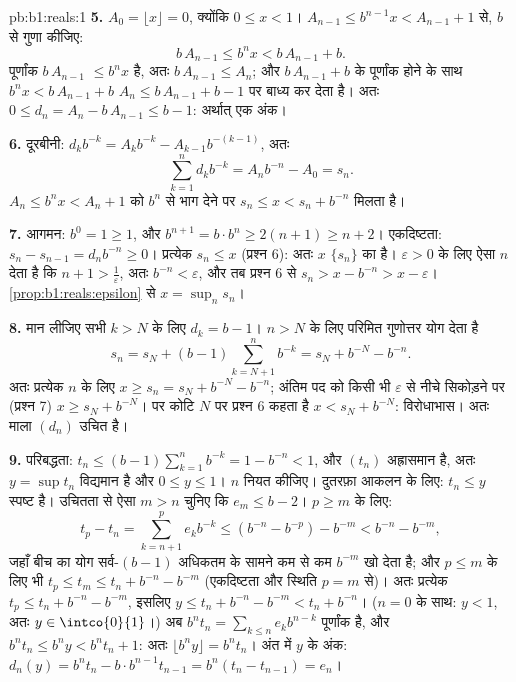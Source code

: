 \begin{solution}{pb:b1:reals:1}
\textbf{5.} $A_0 = \lfloor x \rfloor = 0$, क्योंकि $0 \leq x < 1$। $A_{n-1}
\leq b^{n-1} x < A_{n-1} + 1$ से, $b$ से गुणा कीजिए:
\[
b\,A_{n-1} \leq b^n x < b\,A_{n-1} + b .
\]
पूर्णांक $b\,A_{n-1}$ $\leq b^n x$ है, अतः $b\,A_{n-1} \leq A_n$; और
$b\,A_{n-1} + b$ के पूर्णांक होने के साथ $b^n x < b\,A_{n-1} + b$ $A_n \leq
b\,A_{n-1} + b - 1$ पर बाध्य कर देता है। अतः $0 \leq d_n = A_n - b\,A_{n-1}
\leq b - 1$: अर्थात् एक अंक।

\textbf{6.} दूरबीनी: $d_k b^{-k} = A_k b^{-k} - A_{k-1} b^{-(k-1)}$, अतः
\[
\sum_{k=1}^n d_k b^{-k} = A_n b^{-n} - A_0 = s_n .
\]
$A_n \leq b^n x < A_n + 1$ को $b^n$ से भाग देने पर $s_n \leq x < s_n +
b^{-n}$ मिलता है।

\textbf{7.} आगमन: $b^0 = 1 \geq 1$, और $b^{n+1} = b \cdot b^n \geq 2(n + 1)
\geq n + 2$। एकदिष्टता: $s_n - s_{n-1} = d_n b^{-n} \geq 0$। प्रत्येक $s_n
\leq x$ (प्रश्न 6): अतः $x$ $\{s_n\}$ का  है। $\varepsilon > 0$
के लिए  ऐसा $n$ देता है कि $n + 1 > \frac1\varepsilon$,
अतः $b^{-n} < \varepsilon$, और तब प्रश्न 6 से $s_n > x - b^{-n} > x -
\varepsilon$। \cref{prop:b1:reals:epsilon} से $x = \sup_n s_n$।

\textbf{8.} मान लीजिए सभी $k > N$ के लिए $d_k = b - 1$। $n > N$ के लिए
परिमित गुणोत्तर योग देता है
\[
s_n = s_N + (b - 1)\sum_{k=N+1}^{n} b^{-k}
= s_N + b^{-N} - b^{-n} .
\]
अतः प्रत्येक $n$ के लिए $x \geq s_n = s_N + b^{-N} - b^{-n}$; अंतिम पद को
किसी भी $\varepsilon$ से नीचे सिकोड़ने पर (प्रश्न 7) $x \geq s_N + b^{-N}$।
पर कोटि $N$ पर प्रश्न 6 कहता है $x < s_N + b^{-N}$: विरोधाभास। अतः माला
$(d_n)$ उचित है।

\textbf{9.} परिबद्धता: $t_n \leq (b-1)\sum_{k=1}^n b^{-k} = 1 - b^{-n} < 1$,
और $(t_n)$ अह्रासमान है, अतः $y = \sup t_n$ विद्यमान है और $0 \leq y \leq
1$। $n$ नियत कीजिए। दुतरफ़ा आकलन के लिए: $t_n \leq y$ स्पष्ट है। उचितता से
ऐसा $m > n$ चुनिए कि $e_m \leq b - 2$। $p \geq m$ के लिए:
\[
t_p - t_n = \sum_{k=n+1}^{p} e_k b^{-k}
\leq (b^{-n} - b^{-p}) - b^{-m} < b^{-n} - b^{-m},
\]
जहाँ बीच का योग सर्व-$(b-1)$ अधिकतम के सामने कम से कम $b^{-m}$ खो देता है;
और $p \leq m$ के लिए भी $t_p \leq t_m \leq t_n + b^{-n} - b^{-m}$ (एकदिष्टता
और स्थिति $p = m$ से)। अतः प्रत्येक $t_p \leq t_n + b^{-n} - b^{-m}$, इसलिए
$y \leq t_n + b^{-n} - b^{-m} < t_n + b^{-n}$। ($n = 0$ के साथ: $y < 1$, अतः
$y \in \intco{0}{1}$।) अब $b^n t_n = \sum_{k \leq n} e_k b^{n-k}$ पूर्णांक
है, और $b^n t_n \leq b^n y < b^n t_n + 1$: अतः $\lfloor b^n y \rfloor = b^n
t_n$। अंत में $y$ के अंक: $d_n(y) = b^n t_n - b \cdot b^{n-1} t_{n-1} =
b^n(t_n - t_{n-1}) = e_n$।


\end{solution}
